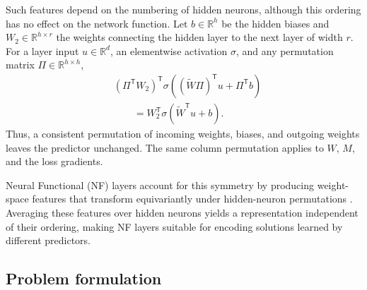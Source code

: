 Such features depend on the numbering of hidden neurons, although
this ordering has no effect on the network function.
Let $b\in\mathbb{R}^h$ be the hidden biases and
$W_2\in\mathbb{R}^{h\times r}$ the weights connecting the hidden layer
to the next layer of width $r$.
For a layer input $u\in\mathbb{R}^d$, an elementwise activation $\sigma$,
and any permutation matrix $\Pi\in\mathbb{R}^{h\times h}$,
\begin{equation}
    \begin{aligned}
        &(\Pi^{\mathsf T}W_2)^{\mathsf T}
        \sigma\!\left(
            (\widetilde W\Pi)^{\mathsf T}u+\Pi^{\mathsf T}b
        \right) \\
        &\qquad= W_2^{\mathsf T}\sigma(\widetilde W^{\mathsf T}u+b).
    \end{aligned}
    \label{eq:hidden-permutation}
\end{equation}
Thus, a consistent permutation of incoming weights, biases, and outgoing
weights leaves the predictor unchanged. The same column permutation
applies to $W$, $M$, and the loss gradients.

Neural Functional (NF) layers account for this symmetry by producing
weight-space features that transform equivariantly under hidden-neuron
permutations \cite{zhou2023permutation}.
Averaging these features over hidden neurons yields a representation
independent of their ordering, making NF layers suitable for encoding
solutions learned by different predictors.

\subsection{Problem formulation}
\label{sec:problem-formulation}


